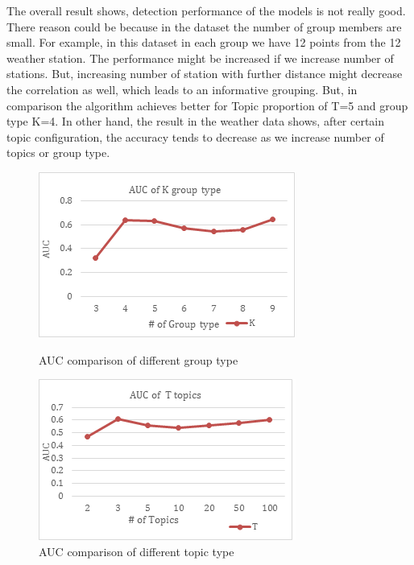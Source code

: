 \documentclass[letterpaper]{article}
\begin{document}
The overall result shows, detection performance of the models is not really good. There reason could be because in the dataset the number of group members are small. For example, in this dataset in each group we have 12 points from the 12 weather station. The performance might be increased if we increase number of stations. But, increasing number of station with further distance might decrease the correlation as well, which leads to an informative grouping. But, in comparison the algorithm achieves better for Topic proportion of T=5 and group type K=4. In other hand, the result in the weather data shows, after certain topic configuration, the accuracy tends to decrease as we increase number of topics or group type. \\
\begin{figure}
\includegraphics{grouptype.png}
\caption{AUC comparison of different group type}
\includegraphics{topic.png}
\caption{AUC comparison of different topic type}
\end{figure}
\end{document}
